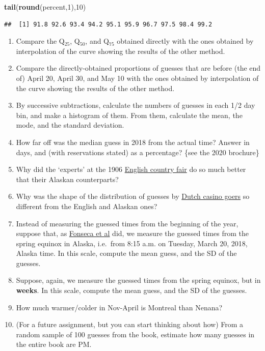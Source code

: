 \documentclass[]{book}
\newenvironment{Shaded}{\begin{snugshade}}{\end{snugshade}}
\newcommand{\DecValTok}[1]{\textcolor[rgb]{0.00,0.00,0.81}{#1}}
\newcommand{\KeywordTok}[1]{\textcolor[rgb]{0.13,0.29,0.53}{\textbf{#1}}}
\newcommand{\NormalTok}[1]{#1}
\begin{document}
\begin{Shaded}
\begin{Highlighting}[]
\KeywordTok{tail}\NormalTok{(}\KeywordTok{round}\NormalTok{(percent,}\DecValTok{1}\NormalTok{),}\DecValTok{10}\NormalTok{)}
\end{Highlighting}
\end{Shaded}

\begin{verbatim}
##  [1] 91.8 92.6 93.4 94.2 95.1 95.9 96.7 97.5 98.4 99.2
\end{verbatim}

\begin{enumerate}
\def\labelenumi{\arabic{enumi}.}
\setcounter{enumi}{2}
\item
  Compare the Q\(_{25}\), Q\(_{50}\), and Q\(_{75}\) obtained directly with the ones obtained by interpolation of the curve showing the results of the other method.
\item
  Compare the directly-obtained proportions of guesses that are before (the end of) April 20, April 30, and May 10 with the ones obtained by interpolation of the curve showing the results of the other method.
\item
  By successive subtractions, calculate the numbers of guesses in each 1/2 day bin, and make a histogram of them. From them, calculate the mean, the mode, and the standard deviation.
\item
  How far off was the median guess in 2018 from the actual time? Answer in days, and (with reservations stated) as a percentage? \{see the 2020 brochure\}
\item
  Why did the `experts' at the 1906 \href{http://galton.org/essays/1900-1911/galton-1907-vox-populi.pdf}{English country fair} do so much better that their Alaskan counterparts?
\item
  Why was the shape of the distribution of guesses by \href{http://www.medicine.mcgill.ca/epidemiology/hanley/bios691/The_wisdom_of_the_inner_crowd_.pdf}{Dutch casino goers} so different from the English and Alaskan ones?
\item
  Instead of measuring the guessed times from the beginning of the year, suppose that, as \href{http://www.medicine.mcgill.ca/epidemiology/hanley/bios691/VoxPopuliNenana.pdf}{Fonseca et al}
  did, we measure the guessed times from the spring equinox in Alaska, i.e.~from 8:15 a.m. on Tuesday, March 20, 2018, Alaska time. In this scale, compute the mean guess, and the SD of the guesses.
\item
  Suppose, again, we measure the guessed times from the spring equinox, but in \textbf{weeks}. In this scale, compute the mean guess, and the SD of the guesses.
\item
  How much warmer/colder in Nov-April is Montreal than Nenana?
\item
  (For a future assignment, but you can start thinking about how) From a random sample of 100 guesses from the book, estimate how many guesses in the entire book are PM.
\end{enumerate}
\end{document}
